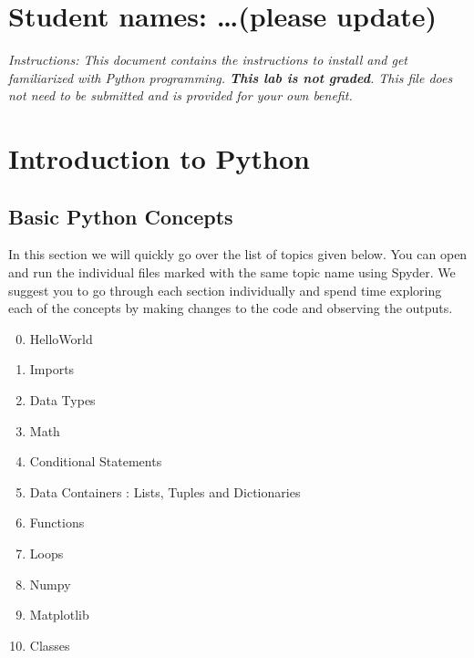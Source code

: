 \documentclass{cmc}
\begin{document}
\maketitle
\pagestyle{fancy}
\tableofcontents
{} 

\newpage
\section*{Student names: \ldots (please update)}

\textit{Instructions: This document contains the instructions to
  install and get familiarized with Python programming.  \textbf{This
    lab is not graded}. This file does not need to be submitted and is
  provided for your own benefit.}

\newpage
\section{Introduction to Python}

\subsection{Basic Python Concepts}

In this section we will quickly go over the list of topics given
below.  You can open and run the individual files marked with the same
topic name using Spyder.  We suggest you to go through each section
individually and spend time exploring each of the concepts by making
changes to the code and observing the outputs.

\begin{enumerate}
  \setcounter{enumi}{-1}
\item HelloWorld
\item Imports
\item Data Types
\item Math
\item Conditional Statements
\item Data Containers : Lists, Tuples and Dictionaries
\item Functions
\item Loops
\item Numpy
\item Matplotlib
\item Classes
\end{enumerate}
\end{document}
